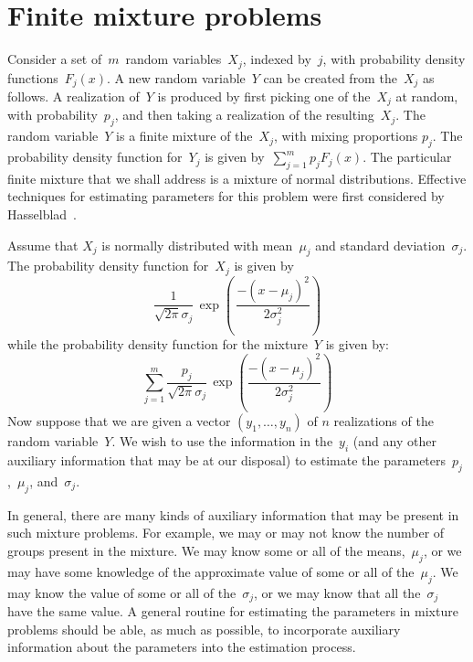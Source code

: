 \documentclass{admbmanual}
\begin{document}
\section{Finite mixture problems}
\label{sec:finite-mixture}

Consider a set of~$m$~random variables~$X_j$, indexed by~$j$,
with probability density functions~$F_j(x)$.
A new random variable~$Y$ can be created from the~$X_j$  as
follows. A realization of~$Y$ is produced by first picking
one of the~$X_j$ at random, with probability~$p_j$, and then
taking a realization of the resulting~$X_j$. The random
variable~$Y$ is a finite mixture of the~$X_j$, with
mixing proportions $p_j$. The probability density function
for~$Y_j$ is given by~$\sum_{j=1}^m p_jF_j(x)$. 
The particular finite mixture that we shall address is
a mixture of normal distributions. Effective techniques for
estimating parameters for this problem were first considered by
Hasselblad~\cite{hasselblad1966}.

Assume that $X_j$ is normally distributed with mean~$\mu_j$
and standard deviation~$\sigma_j$. The probability density function
for~$X_j$ is given by
\begin{equation*}
  \frac{1}{\sqrt{2\pi}\sigma_j}\,\exp\left(\, \frac{-(x-\mu_j)^2}{2\sigma_j^2}\right)
\end{equation*}
while the probability density function for the mixture~$Y$
is given by:
\begin{equation*}
  \sum_{j=1}^m \frac{p_j}{\sqrt{2\pi}\sigma_j}
                        \,\exp\left(\frac{-(x-\mu_j)^2}{2\sigma_j^2}\right)
\end{equation*}
Now suppose that we are given a vector $(y_1,\ldots,y_n)$ of $n$
realizations of the random variable~$Y$. 
We wish to use the information in the~$y_i$ (and any other
auxiliary information that may be at our disposal) to estimate
the parameters~$p_j$,~$\mu_j$, and~$\sigma_j$.  

In general, there are many kinds of auxiliary information that
may be present in such mixture problems. For example, we may 
or may not know the
number of groups present in the mixture. We may know some or all
of the means,~$\mu_j$, or we may have some knowledge of the approximate
value of some or all of the~$\mu_j$. We may know the value of
some or all of the~$\sigma_j$, or we may know that all 
the~$\sigma_j$ have the same value.
A general routine for estimating the parameters in mixture problems
should be able, as much as possible, to incorporate auxiliary information about the parameters into the estimation process.
\end{document}
